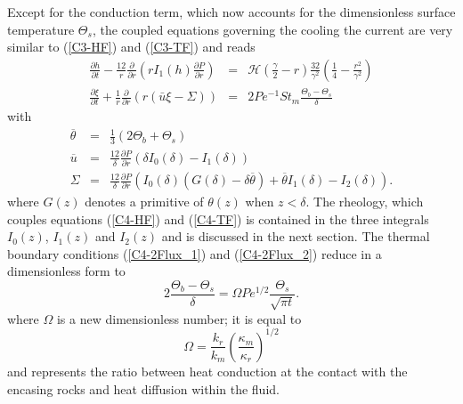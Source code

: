 Except  for   the  conduction  term,   which  now  accounts   for  the
dimensionless  surface temperature  $\Theta_s$, the  coupled equations
governing the  cooling the current  are very similar  to (\ref{C3-HF})
and (\ref{C3-TF}) and reads
\begin{eqnarray}
  \frac{\partial h}{\partial t}-\frac{12}{r}
  \frac{\partial}{\partial      r}
  \left( r I_1(h) \frac{\partial P}{\partial
  r}\right)
  \label{C4-HF}
  & =& \mathcal{H}(\frac{\gamma}{2}-r)\frac{32}{\gamma^{2}}\left(\frac{1}{4}-\frac{r^{2}}{\gamma^{2}}\right)\\
  \frac{\partial                                       \xi}{\partial
  t}+\frac{1}{r}\frac{\partial}{\partial                          r}
  \left( r\left(\bar{u}\xi-\Sigma\right)\right)&=&2Pe^{-1}St_m\frac{\Theta_b-\Theta_s}{\delta}\label{C4-TF}
\end{eqnarray}
with
\begin{eqnarray}
  \overline{\theta}&=&\frac{1}{3}\left(2\Theta_b+\Theta_s\right)\label{C4-tbar}\\
  \overline{u}&=&\frac{12}{\delta}
                  \frac{\partial
                  P}{\partial
                  r}\left(\delta
                  I_0(\delta)-I_1(\delta)\right)\\
  \Sigma &=& \frac{12}{\delta} \frac{\partial P}{\partial r}\left(I_0(\delta)\left(G(\delta)-\delta\overline{\theta}\right)+\overline{\theta}I_1(\delta)-I_2(\delta)\right).
\end{eqnarray}
where $G(z)$ denotes  a primitive of $\theta(z)$  when $z<\delta$. The
rheology, which  couples equations (\ref{C4-HF}) and  (\ref{C4-TF}) is
contained in the  three integrals $I_0(z)$, $I_1(z)$  and $I_2(z)$ and
is discussed  in the  next section.   The thermal  boundary conditions
(\ref{C4-2Flux_1})  and (\ref{C4-2Flux_2})  reduce in  a dimensionless
form to
\begin{equation}
  2\frac{\Theta_b-\Theta_s}{\delta}               =               \Omega
  Pe^{1/2}\frac{\Theta_s}{\sqrt{\pi t}}.
  \label{C4-Boundary-Condi}
\end{equation}
where $\Omega$ is a new dimensionless number; it is equal to
\begin{equation}
  \Omega=\frac{k_r}{k_m}\left(\frac{\kappa_m}{\kappa_r}\right)^{1/2}\label{C4-omega}
\end{equation}
and represents the  ratio between heat conduction at  the contact with
the encasing rocks and heat diffusion within the fluid.


